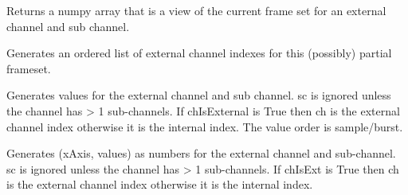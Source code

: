 \documentclass[letterpaper,10pt,english]{sphinxmanual}
\begin{document}
\begin{fulllineitems}
\begin{fulllineitems}
\label{\detokenize{ref/LIS/core/FrameSet:TotalDepth.LIS.core.FrameSet.FrameSet.frameView}}
Returns a numpy array that is a view of the current frame set for an
external channel and sub channel.

\end{fulllineitems}


\begin{fulllineitems}
\label{\detokenize{ref/LIS/core/FrameSet:TotalDepth.LIS.core.FrameSet.FrameSet.genExtChIndexes}}
Generates an ordered list of external channel indexes for this
(possibly) partial frameset.

\end{fulllineitems}


\begin{fulllineitems}
\label{\detokenize{ref/LIS/core/FrameSet:TotalDepth.LIS.core.FrameSet.FrameSet.genChScValues}}
Generates values for the external channel and sub channel.
sc is ignored unless the channel has \textgreater{} 1 sub-channels.
If chIsExternal is True then ch is the external channel index otherwise
it is the internal index.
The value order is sample/burst.

\end{fulllineitems}


\begin{fulllineitems}
\label{\detokenize{ref/LIS/core/FrameSet:TotalDepth.LIS.core.FrameSet.FrameSet.genChScPoints}}
Generates (xAxis, values) as numbers for the external channel and
sub-channel. sc is ignored unless the channel has \textgreater{} 1 sub-channels.
If chIsExt is True then ch is the external channel index otherwise
it is the internal index.

\end{fulllineitems}


\end{fulllineitems}
\end{document}
